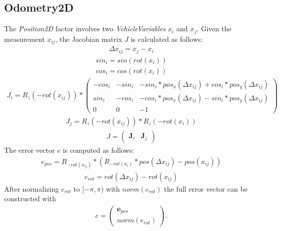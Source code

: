 \subsection{Odometry2D}
The \textit{Position2D} factor involves two \textit{VehicleVariables} $x_i$ and $x_j$. Given the measurement $x_{ij}$, the Jacobian matrix $J$ is calculated as follows:
\begin{align}
	\Delta x_{ij} = x_j - x_i
\end{align}
\begin{align}
	sin_i = sin(rot(x_i))
\end{align}
\begin{align}
	cos_i = cos(rot(x_i))
\end{align}
\begin{align}
	J_i = R_z(-rot(x_{ij})) *
	\begin{pmatrix}
		-cos_i & -sin_i & -sin_i*pos_x(\Delta x_{ij}) + cos_i*pos_y(\Delta x_{ij})\\
		 sin_i & -cos_i & -cos_i*pos_x(\Delta x_{ij}) - sin_i*pos_y(\Delta x_{ij})\\
		     0 &      0 &                                   -1
	\end{pmatrix}
\end{align}
\begin{align}
	J_j = R_z(-rot(x_{ij})) * R_z(-rot(x_i))
\end{align}
\begin{align}
	J =
	\begin{pmatrix}
		\boldsymbol{J}_i & \boldsymbol{J}_j
	\end{pmatrix}
\end{align}
The error vector $e$ is computed as follows:
\begin{align}
	e_{pos} = R_{-rot(x_{ij})} * (R_{-rot(x_i)} * pos(\Delta x_{ij}) - pos(x_{ij}))
\end{align}
\begin{align}
	e_{rot} = rot(\Delta x_{ij}) - rot(x_{ij})
\end{align}
After normalizing $e_{rot}$ to $[-\pi, \pi)$ with $norm(e_{rot})$ the full error vector can be constructed with
\begin{align}
	e =
	\begin{pmatrix}
		\boldsymbol{e}_{pos}\\
		norm(e_{rot})
	\end{pmatrix}
	.
\end{align}

